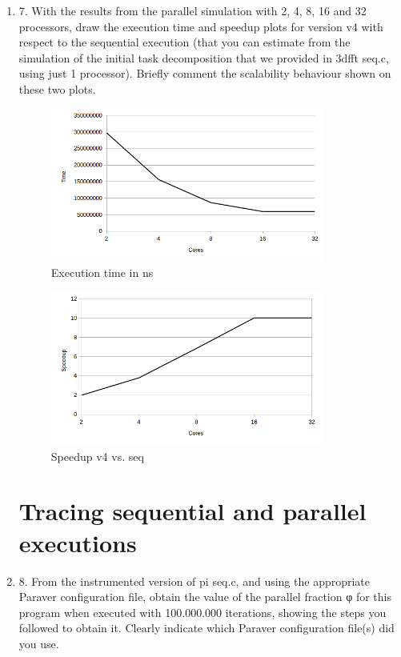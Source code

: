 \documentclass[12pt]{article}
\begin{document}
\begin{enumerate}
\begin{center}
\begin{tabular}{| c || c | c | c | }
\end{tabular}
\end{center}



\item[] 7. With the results from the parallel simulation with 2, 4, 8, 16 and 32 processors, draw the execution
time and speedup plots for version v4 with respect to the sequential execution (that you can
estimate from the simulation of the initial task decomposition that we provided in 3dfft seq.c,
using just 1 processor). Briefly comment the scalability behaviour shown on these two plots.


\begin{figure}[H]%
\centering
\includegraphics[width=9cm]{plotTimeCores.png}
\caption{Execution time in ns }
\label{fig:test}%
\end{figure}
\begin{figure}[H]
\centering
\includegraphics[width=9cm]{plotSpeedup.png}
\caption{Speedup v4 vs. seq}
\label{fig:Speedup plot}%
\end{figure}



\section* {Tracing sequential and parallel executions}


\item[] 8. From the instrumented version of pi seq.c, and using the appropriate Paraver configuration
file, obtain the value of the parallel fraction φ for this program when executed with 100.000.000
iterations, showing the steps you followed to obtain it. Clearly indicate which Paraver configuration
file(s) did you use.




\end{enumerate}
\end{document}
